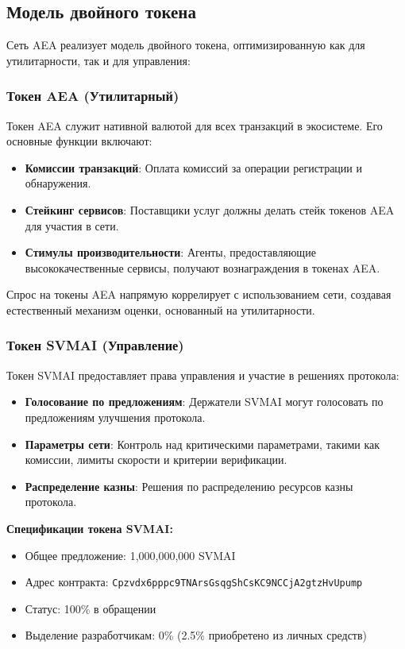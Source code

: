 \documentclass[12pt,a4paper]{article}
\begin{document}
\subsection{Модель двойного токена}

Сеть AEA реализует модель двойного токена, оптимизированную как для утилитарности, так и для управления:

\subsubsection{Токен AEA (Утилитарный)}

Токен AEA служит нативной валютой для всех транзакций в экосистеме. Его основные функции включают:

\begin{itemize}
\item \textbf{Комиссии транзакций}: Оплата комиссий за операции регистрации и обнаружения.
\item \textbf{Стейкинг сервисов}: Поставщики услуг должны делать стейк токенов AEA для участия в сети.
\item \textbf{Стимулы производительности}: Агенты, предоставляющие высококачественные сервисы, получают вознаграждения в токенах AEA.
\end{itemize}

Спрос на токены AEA напрямую коррелирует с использованием сети, создавая естественный механизм оценки, основанный на утилитарности.

\subsubsection{Токен SVMAI (Управление)}

Токен SVMAI предоставляет права управления и участие в решениях протокола:

\begin{itemize}
\item \textbf{Голосование по предложениям}: Держатели SVMAI могут голосовать по предложениям улучшения протокола.
\item \textbf{Параметры сети}: Контроль над критическими параметрами, такими как комиссии, лимиты скорости и критерии верификации.
\item \textbf{Распределение казны}: Решения по распределению ресурсов казны протокола.
\end{itemize}

\textbf{Спецификации токена SVMAI:}
\begin{itemize}
\item Общее предложение: 1,000,000,000 SVMAI
\item Адрес контракта: \texttt{Cpzvdx6pppc9TNArsGsqgShCsKC9NCCjA2gtzHvUpump}
\item Статус: 100\% в обращении
\item Выделение разработчикам: 0\% (2.5\% приобретено из личных средств)
\end{itemize}
\end{document}
